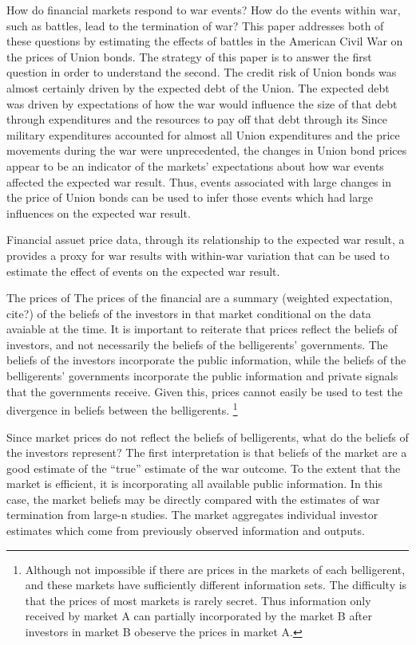 How do financial markets respond to war events?
How do the events within war, such as battles, lead to the termination of war?
This paper addresses both of these questions by estimating the effects of battles in the American Civil War on the prices of Union bonds.
The strategy of this paper is to answer the first question in order to understand the second.
The credit risk of Union bonds was almost certainly driven by the expected debt of the Union.
The expected debt was driven by expectations of how the war would influence the size of that debt through expenditures and the resources to pay off that debt through its
Since military expenditures accounted for almost all Union expenditures and the price movements during the war were unprecedented, the changes in Union bond prices appear to be an indicator of the markets' expectations about how war events affected the expected war result.
Thus, events associated with large changes in the price of Union bonds can be used to infer those events which had large influences on the expected war result.

Financial assuet price data, through its relationship to the expected war result, a provides a proxy for war results with within-war variation that can be used to estimate the effect of events on the expected war result.


The prices of The prices of the financial are a summary (weighted
expectation, cite?) of the beliefs of the investors in that market
conditional on the data avaiable at the time. It is important to
reiterate that prices reflect the beliefs of investors, and not
necessarily the beliefs of the belligerents' governments. The
beliefs of the investors incorporate the public information, while
the beliefs of the belligerents' governments incorporate the public
information and private signals that the governments receive. Given
this, prices cannot easily be used to test the divergence in beliefs
between the belligerents.%
\footnote{Although not impossible if there are prices in the markets
of each belligerent, and these markets have sufficiently different
information sets. The difficulty is that the prices of most markets
is rarely secret. Thus information only received by market A can
partially incorporated by the market B after investors in market B
obeserve the prices in market A.} %

Since market prices do not reflect the beliefs of belligerents, what
do the beliefs of the investors represent? The first interpretation is
that beliefs of the market are a good estimate of the ``true''
estimate of the war outcome. To the extent that the market is
efficient, it is incorporating all available public information.%
In this case, the market beliefs may be directly compared with the
estimates of war termination from large-n studies. The market
aggregates individual investor estimates which come from previously
observed information and outputs.

